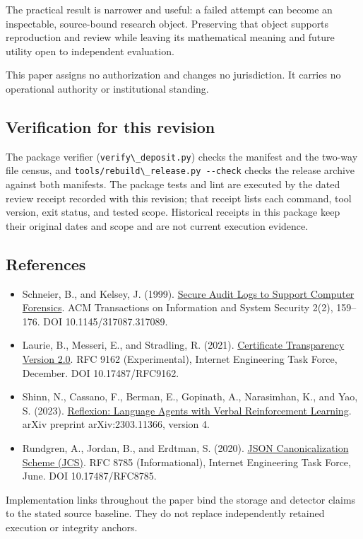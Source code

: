 \documentclass[
  11pt,
]{article}
\newcommand{\passthrough}[1]{#1}
\providecommand{\tightlist}{%
  \setlength{\itemsep}{0pt}\setlength{\parskip}{0pt}}
\begin{document}
The practical result is narrower and useful: a failed attempt can become
an inspectable, source-bound research object. Preserving that object
supports reproduction and review while leaving its mathematical meaning
and future utility open to independent evaluation.

This paper assigns no authorization and changes no jurisdiction. It
carries no operational authority or institutional standing.

\subsection{Verification for this
revision}\label{verification-for-this-revision}

The package verifier (\passthrough{\lstinline!verify\_deposit.py!})
checks the manifest and the two-way file census, and
\passthrough{\lstinline!tools/rebuild\_release.py --check!} checks the
release archive against both manifests. The package tests and lint are
executed by the dated review receipt recorded with this revision; that
receipt lists each command, tool version, exit status, and tested scope.
Historical receipts in this package keep their original dates and scope
and are not current execution evidence.

\subsection{References}\label{references}

\begin{itemize}
\tightlist
\item
  Schneier, B., and Kelsey, J. (1999).
  \href{https://www.schneier.com/academic/archives/1999/05/secure_audit_logs_to.html}{Secure
  Audit Logs to Support Computer Forensics}. ACM Transactions on
  Information and System Security 2(2), 159--176. DOI
  10.1145/317087.317089.
\item
  Laurie, B., Messeri, E., and Stradling, R. (2021).
  \href{https://www.rfc-editor.org/rfc/rfc9162.html}{Certificate
  Transparency Version 2.0}. RFC 9162 (Experimental), Internet
  Engineering Task Force, December. DOI 10.17487/RFC9162.
\item
  Shinn, N., Cassano, F., Berman, E., Gopinath, A., Narasimhan, K., and
  Yao, S. (2023). \href{https://arxiv.org/abs/2303.11366v4}{Reflexion:
  Language Agents with Verbal Reinforcement Learning}. arXiv preprint
  arXiv:2303.11366, version 4.
\item
  Rundgren, A., Jordan, B., and Erdtman, S. (2020).
  \href{https://www.rfc-editor.org/rfc/rfc8785.html}{JSON
  Canonicalization Scheme (JCS)}. RFC 8785 (Informational), Internet
  Engineering Task Force, June. DOI 10.17487/RFC8785.
\end{itemize}

Implementation links throughout the paper bind the storage and detector
claims to the stated source baseline. They do not replace independently
retained execution or integrity anchors.
\end{document}
